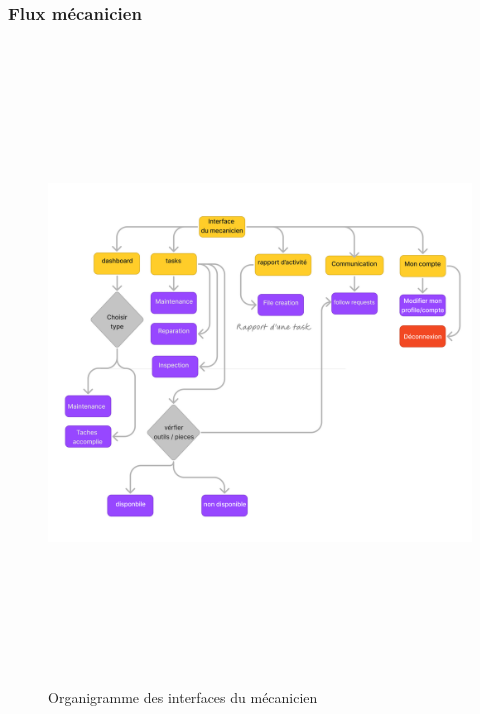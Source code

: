 \subsubsection{Flux mécanicien}
\begin{figure}[htbp]
  \centering
  \includegraphics[width=1\textwidth,height=17cm]{chap2.images/org mecanicien.png}
  \caption{Organigramme des interfaces  du mécanicien}
\end{figure}

\newpage

